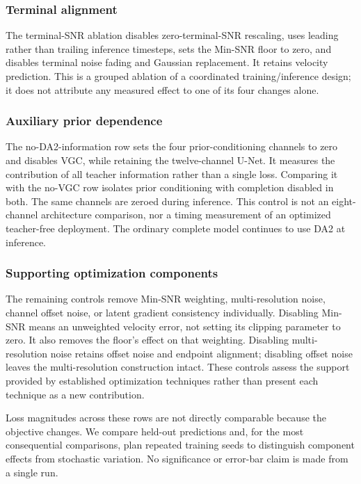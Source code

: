 \documentclass[10pt,journal,a4paper]{IEEEtran}
\begin{document}
\subsubsection{Terminal alignment}
The terminal-SNR ablation disables zero-terminal-SNR rescaling, uses leading rather than trailing inference timesteps, sets the Min-SNR floor to zero, and disables terminal noise fading and Gaussian replacement. It retains velocity prediction. This is a grouped ablation of a coordinated training/inference design; it does not attribute any measured effect to one of its four changes alone.

\subsubsection{Auxiliary prior dependence}
The no-DA2-information row sets the four prior-conditioning channels to zero and disables VGC, while retaining the twelve-channel U-Net. It measures the contribution of all teacher information rather than a single loss. Comparing it with the no-VGC row isolates prior conditioning with completion disabled in both. The same channels are zeroed during inference. This control is not an eight-channel architecture comparison, nor a timing measurement of an optimized teacher-free deployment. The ordinary complete model continues to use DA2 at inference.



\subsubsection{Supporting optimization components}
The remaining controls remove Min-SNR weighting, multi-resolution noise, channel offset noise, or latent gradient consistency individually. Disabling Min-SNR means an unweighted velocity error, not setting its clipping parameter to zero. It also removes the floor's effect on that weighting. Disabling multi-resolution noise retains offset noise and endpoint alignment; disabling offset noise leaves the multi-resolution construction intact. These controls assess the support provided by established optimization techniques rather than present each technique as a new contribution.



Loss magnitudes across these rows are not directly comparable because the objective changes. We compare held-out predictions and, for the most consequential comparisons, plan repeated training seeds to distinguish component effects from stochastic variation. No significance or error-bar claim is made from a single run.
\end{document}
